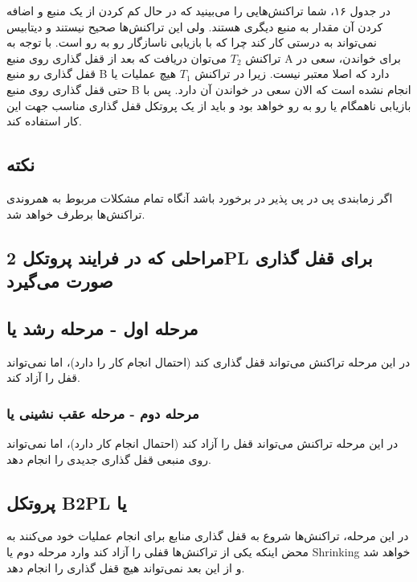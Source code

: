 در جدول ۱۶، شما تراکنش‌هایی را می‌بینید که در حال کم کردن از یک منبع و اضافه
کردن آن مقدار به منبع دیگری هستند. ولی این تراکنش‌ها صحیح نیستند و دیتابیس
نمی‌تواند به درستی کار کند چرا که با بازیابی ناسازگار رو به رو است. با توجه به
تراکنش $T_{2}$ می‌توان دریافت که بعد از قفل گذاری روی منبع A برای خواندن، سعی در
قفل گذاری رو منبع B دارد که اصلا معتبر نیست. زیرا در تراکنش $T_{1}$ هیچ عملیات
یا حتی قفل گذاری روی منبع B انجام نشده است که الان سعی در خواندن آن دارد. پس با
بازیابی ناهمگام یا  رو به رو خواهد بود و باید از یک
پروتکل قفل گذاری مناسب جهت این کار استفاده کند.

\subsection*{نکته}

اگر زمابندی پی در پی پذیر در برخورد باشد آنگاه تمام مشکلات مربوط به
همروندی تراکنش‌ها برطرف خواهد شد.

\subsection{مراحلی که در فرایند پروتکل 2PL برای قفل گذاری صورت می‌گیرد}

\subsection*{مرحله اول - مرحله رشد یا }

در این مرحله تراکنش می‌تواند قفل گذاری کند (احتمال انجام کار را دارد)، اما
نمی‌تواند قفل را آزاد کند.

\subsubsection*{مرحله دوم - مرحله عقب نشینی یا }

در این مرحله تراکنش می‌تواند قفل را آزاد کند (احتمال انجام کار دارد)، اما
نمی‌تواند روی منبعی قفل گذاری جدیدی را انجام دهد.

\newpage

\subsection{پروتکل B2PL یا }

در این مرحله، تراکنش‌ها شروع به قفل گذاری منابع برای انجام عملیات خود می‌کنند به
محض اینکه یکی از تراکنش‌ها قفلی را آزاد کند وارد مرحله دوم یا Shrinking خواهد شد
و از این بعد نمی‌تواند هیچ قفل گذاری را انجام دهد.


